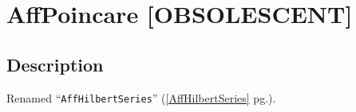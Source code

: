 \documentclass[a4paper]{mybook}
\newenvironment{command}{}{} %
\begin{document}
\section{AffPoincare [OBSOLESCENT]}
\label{AffPoincare [OBSOLESCENT]}
\begin{command} %



\subsection*{Description}

Renamed ``\verb&AffHilbertSeries&'' (\ref{AffHilbertSeries} pg.\pageref{AffHilbertSeries}).

\end{command} %
\end{document}
